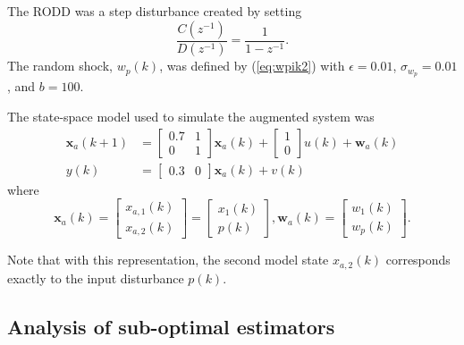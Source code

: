 The \gls{RODD} was a step disturbance created by setting
\begin{equation}
	\frac{C(z^{-1})}{D(z^{-1})} = \frac{1}{1-z^{-1}}.
\end{equation}
The random shock, $w_p(k)$, was defined by (\ref{eq:wpik2}) with $\epsilon=0.01$, $\sigma_{w_p}=0.01$, and $b=100$.

The state-space model used to simulate the augmented system was
\begin{equation} \label{eq:sim-sys-siso-ss-aug}
	\begin{split}
	\mathbf{x}_{a}(k+1) & =\left[\begin{array}{cc}
		0.7 & 1 \\
		0 & 1
	\end{array}\right] \mathbf{x}_{a}(k)+\left[\begin{array}{l}
		1 \\
		0
	\end{array}\right] u(k) + \mathbf{w}_{a}(k) \\
	y(k) & =\left[\begin{array}{cc}
	0.3 & 0
\end{array}\right] \mathbf{x}_{a}(k) + v(k)
\end{split}
\end{equation}
where
\begin{equation} \label{eq:sim-sys-siso-ss-aug2}
		\mathbf{x}_{a}(k) = \left[\begin{array}{l}
			x_{a,1}(k) \\
			x_{a,2}(k)
		\end{array}\right] = \left[\begin{array}{l}
		x_{1}(k) \\
		p(k)
	\end{array}\right], \mathbf{w}_{a}(k) = \left[\begin{array}{l}
	w_1(k) \\
	w_{p}(k)
\end{array}\right] .
\end{equation}

Note that with this representation, the second model state $x_{a,2}(k)$ corresponds exactly to the input disturbance $p(k)$.

\subsection{Analysis of sub-optimal estimators} \label{sim-obs-lin-1-SKF-analysis}


